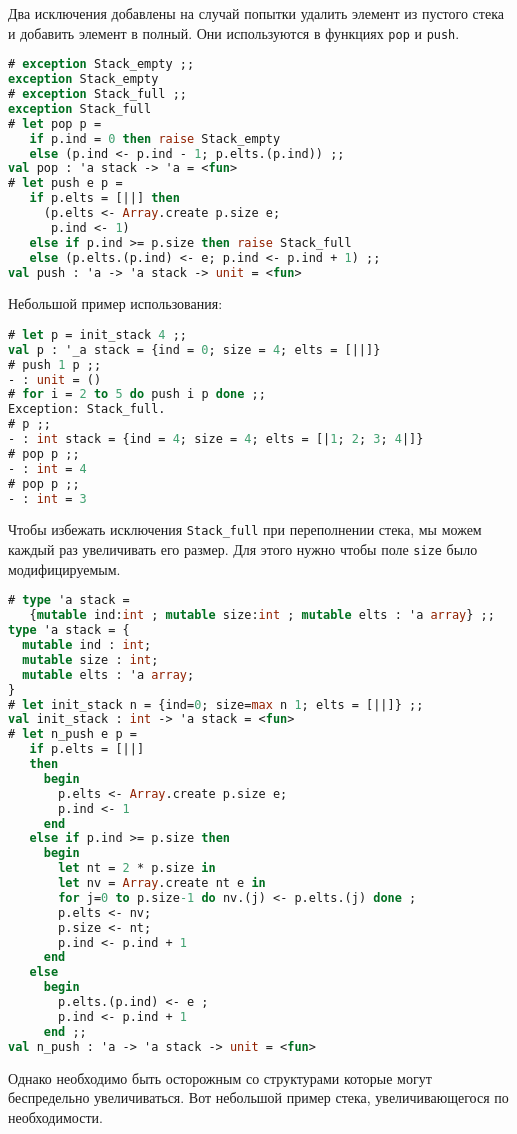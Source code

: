 Два исключения добавлены на случай попытки удалить элемент из пустого стека и
добавить элемент в полный. Они используются в функциях \texttt{pop} и
\texttt{push}.

\begin{lstlisting}[language=OCaml]
# exception Stack_empty ;;
exception Stack_empty
# exception Stack_full ;;
exception Stack_full
# let pop p =
   if p.ind = 0 then raise Stack_empty
   else (p.ind <- p.ind - 1; p.elts.(p.ind)) ;;
val pop : 'a stack -> 'a = <fun>
# let push e p =
   if p.elts = [||] then
     (p.elts <- Array.create p.size e;
      p.ind <- 1)
   else if p.ind >= p.size then raise Stack_full
   else (p.elts.(p.ind) <- e; p.ind <- p.ind + 1) ;;
val push : 'a -> 'a stack -> unit = <fun>
\end{lstlisting}

Небольшой пример использования:

\begin{lstlisting}[language=OCaml]
# let p = init_stack 4 ;;
val p : '_a stack = {ind = 0; size = 4; elts = [||]}
# push 1 p ;;
- : unit = ()
# for i = 2 to 5 do push i p done ;;
Exception: Stack_full.
# p ;;
- : int stack = {ind = 4; size = 4; elts = [|1; 2; 3; 4|]}
# pop p ;;
- : int = 4
# pop p ;;
- : int = 3
\end{lstlisting}

Чтобы избежать исключения \texttt{Stack\_full} при переполнении стека, мы можем
каждый раз увеличивать его размер. Для этого нужно чтобы поле \texttt{size} было
модифицируемым.

\begin{lstlisting}[language=OCaml]
# type 'a stack =
   {mutable ind:int ; mutable size:int ; mutable elts : 'a array} ;;
type 'a stack = {
  mutable ind : int;
  mutable size : int;
  mutable elts : 'a array;
}
# let init_stack n = {ind=0; size=max n 1; elts = [||]} ;;
val init_stack : int -> 'a stack = <fun>
# let n_push e p =
   if p.elts = [||]
   then
     begin
       p.elts <- Array.create p.size e;
       p.ind <- 1
     end
   else if p.ind >= p.size then
     begin
       let nt = 2 * p.size in
       let nv = Array.create nt e in
       for j=0 to p.size-1 do nv.(j) <- p.elts.(j) done ;
       p.elts <- nv;
       p.size <- nt;
       p.ind <- p.ind + 1
     end
   else
     begin
       p.elts.(p.ind) <- e ;
       p.ind <- p.ind + 1
     end ;;
val n_push : 'a -> 'a stack -> unit = <fun>
\end{lstlisting}

Однако необходимо быть осторожным со структурами которые могут беспредельно
увеличиваться. Вот небольшой пример стека, увеличивающегося по необходимости.

